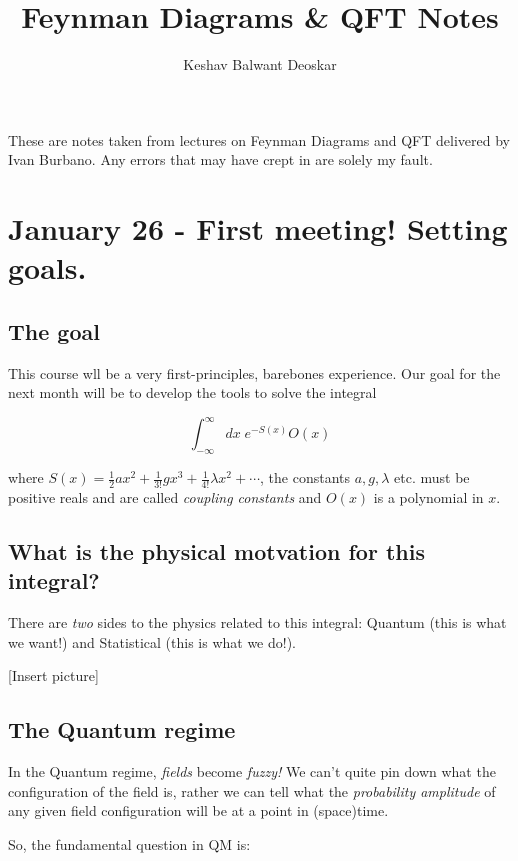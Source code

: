 \documentclass{article}
\title{Feynman Diagrams \& QFT Notes}
\author{Keshav Balwant Deoskar}
\begin{document}
\maketitle

These are notes taken from lectures on Feynman Diagrams and QFT delivered by Ivan Burbano. Any errors that may have crept in are solely my fault.

\tableofcontents

\pagebreak

\section{January 26 - First meeting! Setting goals.}


\vskip 1cm
\subsection{The goal}
This course wll be a very first-principles, barebones experience. Our goal for the next month will be to develop the tools to solve the integral

\[ \int_{-\infty}^{\infty} dx \; e^{-S(x)} O(x)\]

where $S(x) = \frac{1}{2}ax^2 + \frac{1}{3!} gx^3 + \frac{1}{4!}\lambda x^2 + \cdots$, the constants $a, g, \lambda$ etc. must be positive reals and are called \emph{coupling constants} and $O(x)$ is a polynomial in $x$. 

\vskip 1cm
\subsection*{What is the physical motvation for this integral?}

There are \emph{two} sides to the physics related to this integral: Quantum (this is what we want!) and Statistical (this is what we do!).
\vskip 1cm

[Insert picture]

\vskip 0.5cm
\subsection{The Quantum regime}
In the Quantum regime, \emph{fields} become \emph{fuzzy!} We can't quite pin down what the configuration of the field is, rather we can tell what the \emph{probability amplitude} of any given field configuration will be at a point in (space)time.

\vskip 0.5cm
So, the fundamental question in QM is: 
\end{document}

